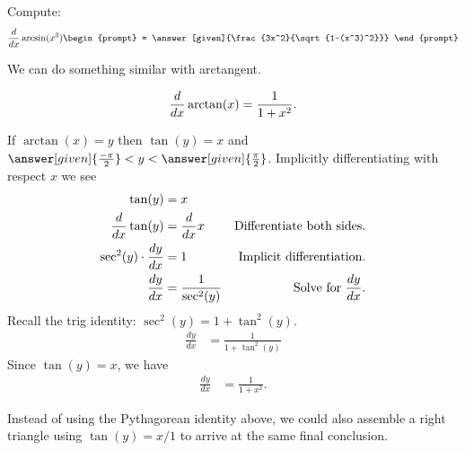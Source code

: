 \documentclass{ximera}
\begin{document}
\begin{question}
  Compute:
  \[
  \ddx \arcsin(x^3)
  \begin{prompt}
    = \answer[given]{\frac{3x^2}{\sqrt{1-(x^3)^2}}}
  \end{prompt}
  \]
\end{question}



We can do something similar with arctangent. 


\begin{theorem}
  \[
  \frac{d}{\mathop{}\!d x} \arctan(x) = \frac{1}{1+x^2}.
  \]
  \begin{explanation} 
    If
    \(
    \arctan(x) = y
    \)
    then $\tan(y) = x$ and $\answer[given]{\frac{-\pi}{2}}<
    y< \answer[given]{\frac{\pi}{2}}$.  Implicitly
    differentiating with respect $x$ we see
    \begin{align*}
      \tan(y) &= x\\
      \frac{d}{\mathop{}\!d x} \tan(y) &= \frac{d}{\mathop{}\!d x} x         &\text{Differentiate both sides.}\\
      \sec^2(y) \cdot \frac{dy}{dx} &= 1   &\text{Implicit differentiation.}\\
     \frac{dy}{dx} &= \frac{1}{\sec^2(y)}   &\text{Solve for $\frac{dy}{dx}$.}
       \end{align*}
      Recall the trig identity:  $\sec^2(y)=1+\tan^2(y)$.\\
        \begin{align*}
          \frac{dy}{dx} &= \frac{1}{1+\tan^2(y)} 
         \end{align*}
         Since  $\tan(y) = x$, we have\\
          \begin{align*}
          \frac{dy}{dx} &= \frac{1}{1+x^2} .
         \end{align*}
         
         Instead of using the Pythagorean identity above, we could also assemble a right triangle using $\tan(y)=x/1$ to arrive at the same final conclusion.
        

\end{explanation}
\end{theorem}
\end{document}
